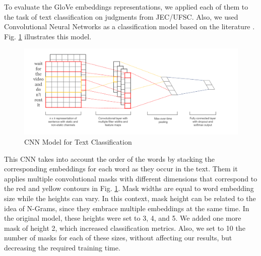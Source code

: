 To evaluate the GloVe embeddings representations, we applied each of them to the task of text classification on judgments from JEC/UFSC. Also, we used Convolutional Neural Networks as a classification model based on the literature \cite{Kim2014}. Fig. \ref{fig:cnn_model} illustrates this model.

\begin{figure}[htb]
    \centering
    \caption{CNN Model for Text Classification}
    \label{fig:cnn_model}
    \includegraphics[width=\textwidth]{images/chapters/cnn_architecture.png}
    
\end{figure}

This CNN takes into account the order of the words by stacking the corresponding embeddings for each word as they occur in the text. 
Them it applies multiple convolutional masks with different dimensions that correspond to the red and yellow contours in Fig. \ref{fig:cnn_model}. Mask widths are equal to word embedding size while the heights can vary. In this context, mask height can be related to the idea of N-Grams, since they embrace multiple embeddings at the same time. 
In the original model, these heights were set to 3, 4, and 5. We added one more mask of height 2, which increased classification metrics. Also, we set to 10 the number of masks for each of these sizes, without affecting our results, but decreasing the required training time. 

